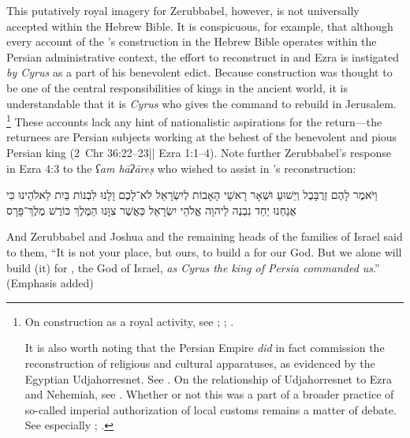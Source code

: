 This putatively royal imagery for Zerubbabel, however, is not universally accepted within the Hebrew Bible. It is conspicuous, for example, that although every account of the \secondtemple's construction in the Hebrew Bible operates within the Persian administrative context, the effort to reconstruct \thetemple in \chronicles and Ezra is instigated \emph{by Cyrus} as a part of his benevolent edict. Because \temple construction was thought to be one of the central responsibilities of kings in the ancient world, it is understandable that it is \emph{Cyrus} who gives the command to rebuild \thetemple in Jerusalem.%
    \footnote{On \temple construction as a royal activity, see
        \cite{kapelrud_orientalia1963};
        \cite{petersen_cbq1974};
        \cite{laato_zaw1994}.

        It is also worth noting that the Persian Empire \emph{did} in fact commission the reconstruction of religious and cultural apparatuses, as evidenced by the Egyptian Udjahorresnet. See 
            \cite{lloyd_jea1982}. On the relationship of Udjahorresnet to Ezra and Nehemiah, see 
            \cite{blenkinsopp_jbl1987}.
        Whether or not this was a part of a broader practice of so-called imperial authorization of local customs remains a matter of debate. See especially
            \cite{frei_frei1984};
            \cite{frei_watts2001}.}
These accounts lack any hint of nationalistic aspirations for the return---the returnees are Persian subjects working at the behest of the benevolent and pious Persian king (2~Chr 36:22--23|| Ezra 1:1--4). Note further Zerubbabel's response in Ezra 4:3 to the \emph{ʕam hāʔāreṣ} who wished to assist in \thetemple's reconstruction:
\begin{hebrewtext}
    וַיֹּאמֶר לָהֶם זְרֻבָּבֶל וְיֵשׁוּעַ וּשְׁאָר רָאשֵׁי הָאָבוֹת לְיִשְׂרָאֵל לֹא־לָכֶם וָלָנוּ לִבְנוֹת בַּיִת לֵאלֹהֵינוּ כִּי אֲנַחְנוּ יַחַד נִבְנֶה לַיהוָה אֱלֹהֵי יִשְׂרָאֵל כַּאֲשֶׁר צִוָּנוּ הַמֶּלֶךְ כּוֹרֶשׁ מֶלֶךְ־פָּרָס
\end{hebrewtext}
\begin{translation}
    And Zerubbabel and Joshua and the remaining heads of the families of Israel said to them, ``It is not your place, but ours, to build a \temple for our God. But we alone will build (it) for \yahweh, the God of Israel, \emph{as Cyrus the king of Persia commanded us}.'' (Emphasis added)
\end{translation}
\noindent
